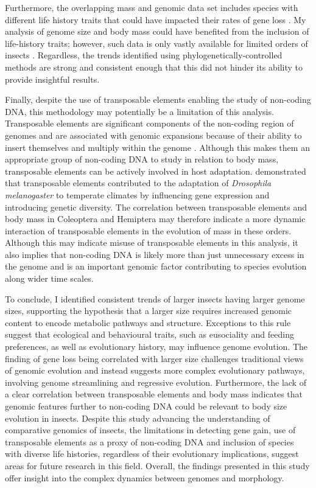 \documentclass[11pt]{article}
\begin{document}
Furthermore, the overlapping mass and genomic data set includes species with different life history traits that could have impacted their rates of gene loss \citep{leps-phylogeny, arthropod-gs-phylogeny}. My analysis of genome size and body mass could have benefited from the inclusion of life-history traits; however, such data is only vastly available for limited orders of insects \citep{shirey}. Regardless, the trends identified using phylogenetically-controlled methods are strong and consistent enough that this did not hinder its ability to provide insightful results.

Finally, despite the use of transposable elements enabling the study of non-coding DNA, this methodology may potentially be a limitation of this analysis. Transposable elements are significant components of the non-coding region of genomes and are associated with genomic expansions because of their ability to insert themselves and multiply within the genome \citep{hadji-te-rna}. Although this makes them an appropriate group of non-coding DNA to study in relation to body mass, transposable elements can be actively involved in host adaptation. \cite{transposable-elements-drosophila} demonstrated that transposable elements contributed to the adaptation of \textit{Drosophila melanogaster} to temperate climates by influencing gene expression and introducing genetic diversity. The correlation between transposable elements and body mass in Coleoptera and Hemiptera may therefore indicate a more dynamic interaction of transposable elements in the evolution of mass in these orders. Although this may indicate misuse of transposable elements in this analysis, it also implies that non-coding DNA is likely more than just unnecessary excess in the genome and is an important genomic factor contributing to species evolution along wider time scales.

To conclude, I identified consistent trends of larger insects having larger genome sizes, supporting the hypothesis that a larger size requires increased genomic content to encode metabolic pathways and structure. Exceptions to this rule suggest that ecological and behavioural traits, such as eusociality and feeding preferences, as well as evolutionary history, may influence genome evolution. The finding of gene loss being correlated with larger size challenges traditional views of genomic evolution and instead suggests more complex evolutionary pathways, involving genome streamlining and regressive evolution. Furthermore, the lack of a clear correlation between transposable elements and body mass indicates that genomic features further to non-coding DNA could be relevant to body size evolution in insects. Despite this study advancing the understanding of comparative genomics of insects, the limitations in detecting gene gain, use of transposable elements as a proxy of non-coding DNA and inclusion of species with diverse life histories, regardless of their evolutionary implications, suggest areas for future research in this field. Overall, the findings presented in this study offer insight into the complex dynamics between genomes and morphology.
\end{document}

